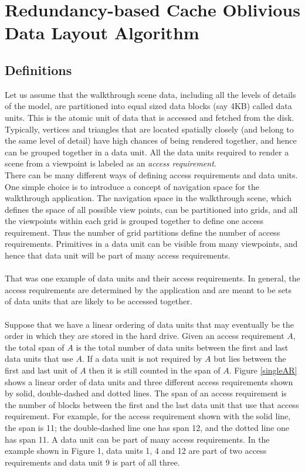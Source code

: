 
\section{Redundancy-based Cache Oblivious Data Layout Algorithm}


\subsection{Definitions}

Let us assume that the walkthrough scene data, including all the levels of
details of the model, are partitioned into equal sized data blocks (say 4KB)
called data units. This is the atomic unit of data that is accessed and fetched
from the disk. Typically, vertices and triangles that are located spatially
closely (and belong to the same level of detail) have high chances of being
rendered together, and hence can be grouped together in a data unit. All the
data units required to render a scene from a viewpoint is labeled as an {\em
access requirement}. 
\\
There can be many different ways of defining access requirements and data
units. One simple choice is to introduce a concept of navigation space for the
walkthrough application.
The navigation space in the walkthrough scene, which defines the space of all
possible view points, can be partitioned into grids,  and all the viewpoints
within each grid is grouped together to define one access requirement. Thus the
number of grid partitions define the number of access requirements. Primitives
in a data unit can be visible from many viewpoints, and hence that data unit
will be part of many access requirements. \\
\\
That was one example of data units and their access requirements. In general,
the access requirements are determined by the application and are meant to be
sets of data units that are likely to be accessed together. \\
\\
Suppose that we have a linear ordering of data units that may eventually be the
order in which they are stored in the hard drive.  Given an access requirement
$A$, the total span of $A$ is the total number of data units between the first
and last data units that use $A$. If a data unit is not required by $A$ but
lies between the first and last unit of $A$ then it is still counted in the
span of $A$. Figure \ref{singleAR} shows a linear order of data units and three
different access requirements shown by solid, double-dashed and dotted lines.
The span of an access requirement is the number of blocks between the first and
the last data unit that use that access requirement. For example, for the
access requirement shown with the solid line, the span is 11; the double-dashed
line one has span 12, and the dotted line one has span 11. A data unit can be
part of many access requirements. In the example shown in Figure 1, data units
1, 4 and 12 are part of two access requirements and data unit 9 is part of all
three. \\ \\

